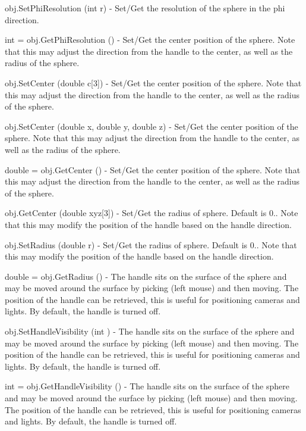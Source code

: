 \begin{DoxyItemize}
\item {\ttfamily obj.\-Set\-Phi\-Resolution (int r)} -\/ Set/\-Get the resolution of the sphere in the phi direction.  
\item {\ttfamily int = obj.\-Get\-Phi\-Resolution ()} -\/ Set/\-Get the center position of the sphere. Note that this may adjust the direction from the handle to the center, as well as the radius of the sphere.  
\item {\ttfamily obj.\-Set\-Center (double c\mbox{[}3\mbox{]})} -\/ Set/\-Get the center position of the sphere. Note that this may adjust the direction from the handle to the center, as well as the radius of the sphere.  
\item {\ttfamily obj.\-Set\-Center (double x, double y, double z)} -\/ Set/\-Get the center position of the sphere. Note that this may adjust the direction from the handle to the center, as well as the radius of the sphere.  
\item {\ttfamily double = obj.\-Get\-Center ()} -\/ Set/\-Get the center position of the sphere. Note that this may adjust the direction from the handle to the center, as well as the radius of the sphere.  
\item {\ttfamily obj.\-Get\-Center (double xyz\mbox{[}3\mbox{]})} -\/ Set/\-Get the radius of sphere. Default is 0.. Note that this may modify the position of the handle based on the handle direction.  
\item {\ttfamily obj.\-Set\-Radius (double r)} -\/ Set/\-Get the radius of sphere. Default is 0.. Note that this may modify the position of the handle based on the handle direction.  
\item {\ttfamily double = obj.\-Get\-Radius ()} -\/ The handle sits on the surface of the sphere and may be moved around the surface by picking (left mouse) and then moving. The position of the handle can be retrieved, this is useful for positioning cameras and lights. By default, the handle is turned off.  
\item {\ttfamily obj.\-Set\-Handle\-Visibility (int )} -\/ The handle sits on the surface of the sphere and may be moved around the surface by picking (left mouse) and then moving. The position of the handle can be retrieved, this is useful for positioning cameras and lights. By default, the handle is turned off.  
\item {\ttfamily int = obj.\-Get\-Handle\-Visibility ()} -\/ The handle sits on the surface of the sphere and may be moved around the surface by picking (left mouse) and then moving. The position of the handle can be retrieved, this is useful for positioning cameras and lights. By default, the handle is turned off.  

\end{DoxyItemize}
